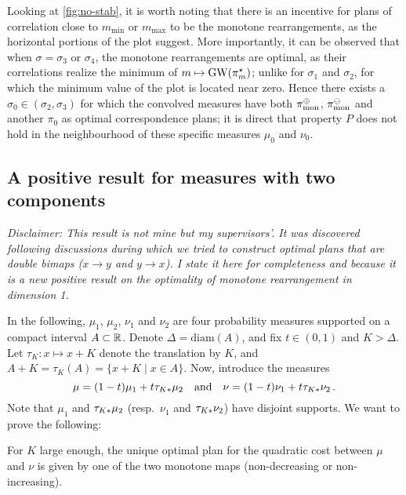                 Looking at \cref{fig:no-stab}, it is worth noting that there is an incentive for plans of correlation close to $m_\text{min}$ or $m_\text{max}$ to be the monotone rearrangements, as the horizontal portions of the plot suggest. More importantly, it can be observed that when $\sigma=\sigma_3$ or $\sigma_4$, the monotone rearrangements are optimal, as their correlations realize the minimum of $m\mapsto \operatorname{GW}(\pi^\star_m)$; unlike for $\sigma_1$ and $\sigma_2$, for which the minimum value of the plot is located near zero. Hence there exists a $\sigma_0\in(\sigma_2,\sigma_3)$ for which the convolved measures have both $\pi_\text{mon}^\oplus$, $\pi_\text{mon}^\ominus$ and another $\pi_0$ as optimal correspondence plans; it is direct that property $P$ does not hold in the neighbourhood of these specific measures $\mu_0$ and $\nu_0$.

                \subsection{A positive result for measures with two components}
            \label{subsec:quadra_1D_positive}

    \begin{center}
        \textit{Disclaimer: This result is not mine but my supervisors'. It was discovered following discussions during which we tried to construct optimal plans that are double bimaps ($x\to y$ and $y\to x$). I state it here for completeness and because it is a new positive result on the optimality of monotone rearrangement in dimension 1.}
    \end{center}
            In the following, $\mu_1$, $\mu_2$, $\nu_1$ and $\nu_2$ are four probability measures supported on a compact interval $A \subset \mathbb{R}$. Denote $\Delta = \mathrm{diam}(A)$, and fix $t \in (0,1)$ and $K > \Delta$. Let $\tau_K : x \mapsto x + K$ denote the translation by $K$, and $A+K = \tau_K(A) = \{x + K\mid x \in A\}$. Now, introduce the measures
            \begin{equation}
             \mu = (1-t) \mu_1 + t \tau_{K*} \mu_2 \quad \text{and}  \quad \nu = (1-t) \nu_1 + t \tau_{K*} \nu_2\,.
             \end{equation}
            Note that $\mu_1$ and $\tau_{K*} \mu_2$ (resp.~$\nu_1$ and $\tau_{K*}\nu_2$) have disjoint supports. We want to prove the following:

            \begin{proposition}\label{prop:measure_separation}
                For $K$ large enough, the unique optimal plan for the quadratic cost between  $\mu$ and $\nu$ is given by one of the two monotone maps (non-decreasing or non-increasing).
            \end{proposition}

